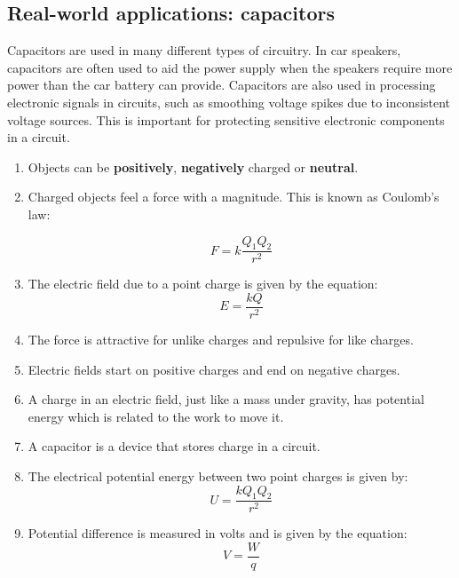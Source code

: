 \subsection{Real-world applications: capacitors}
Capacitors are used in many different types of circuitry.  In car
speakers, capacitors are often used to aid the power supply when
the speakers require more power than the car battery can provide.
Capacitors are also used in processing electronic signals in
circuits, such as smoothing voltage spikes due to inconsistent
voltage sources. This is important for protecting sensitive electronic components in a circuit.

\begin{enumerate}
\item Objects can be \textbf{positively}, \textbf{negatively} charged or \textbf{neutral}.
\item Charged objects feel a force with a magnitude. This is known as Coulomb's law:

\begin{equation*}
F = k \frac{Q_1Q_2}{r^2}
\end{equation*}

\item The electric field due to a point charge is given by the equation:
\begin{equation*}
E = \frac{kQ}{r^2}
\end{equation*}

\item The force is attractive for unlike charges and repulsive for
like charges.

\item Electric fields start on positive charges and end on negative
charges.

\item A charge in an electric field, just like a mass under gravity,
has potential energy which is related to the work to move it.
\item A capacitor is a device that stores charge in a circuit.

\item The electrical potential energy between two point charges is given by:
\begin{equation*}
U = \frac{kQ_{1}Q_{2}}{r^2}
\end{equation*}

\item Potential difference is measured in volts and is given by the equation:
\begin{equation*}
V = \frac{W}{q}
\end{equation*}


\end{enumerate}
